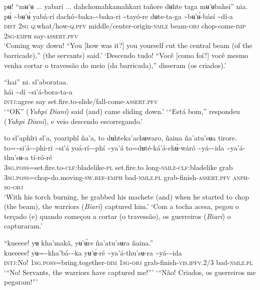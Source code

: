\documentclass[output=paper,
modfonts,nonflat
]{langsci/langscibook}
\begin{document}
\ea pʉ! “mʉ'ʉ ... yabari ... dahchomahkamahkari tañore dʉhte taga mʉ'ʉbahsi” nia. \\[.3em]
\gll pʉ́	{\textasciitilde}bʉ'ʉ́	yabá-rí	dachó{\textasciitilde}baka-{\textasciitilde}baka-ri	{\textasciitilde}tayó-re	dʉte-ta-ga {\textasciitilde}bʉ'ʉ́-básí	{\textasciitilde}dí-a\\
     \textsc{dist}	2\textsc{sg}	\textsc{q:}what/how-\textsc{q.pfv}	middle/center-origin\textsc{-nmlz}	beam\textsc{-obj}	chop-come-\textsc{imp} 2\textsc{sg-emph}	say-\textsc{assert.pfv}\\
\glt ‘Coming way down! “You [how was it?] you yourself cut the central beam (of the barricade),” (the servants) said.'
\glt ‘Descendo tudo! “Você [como foi?] você mesmo venha cortar o travessão do meio (da barricada),” disseram (os criados).’
\z 

\ea “hai” ni. sĩ'aborataa.  \\[.3em]
\gll hái	{\textasciitilde}dí	{\textasciitilde}si'á-bora-ta-a \\
     \textsc{intj:}agree	say	set.fire.to-slide/fall-come-\textsc{assert.pfv}\\
\glt ‘“OK” (\textit{Yuhpi Diani}) said (and) came sliding down.’
\glt ‘“Está bom,” respondeu (\textit{Yuhpi Diani}), e veio descendo escorregando.’
\z 

\ea to sĩ'aphĩri sĩ'a, yoariphĩ ña'a, to dʉhteka'achʉwaro, ñaina ña'atu'sʉa tirore. \\[.3em]
\gll to={\textasciitilde}si'á-{\textasciitilde}phi-ri	{\textasciitilde}si'á	yoá-rí-{\textasciitilde}phí	{\textasciitilde}ya'á to=dʉté-ká'á-chʉ́-wáró	{\textasciitilde}yá-{\textasciitilde}ida	{\textasciitilde}ya'á-thu'sʉ-a	tí-ró-ré\\
     3\textsc{sg.poss}=set.fire.to-\textsc{clf:}bladelike\textsc{-pl}	set.fire.to	long\textsc{-nmlz-clf:}bladelike	grab 3\textsc{sg.poss}=chop-do.moving-\textsc{sw.ref-emph}	bad\textsc{-nmlz.pl}	grab-finish-\textsc{assert.pfv}	\textsc{anph-sg-obj}\\
\glt ‘With his torch burning, he grabbed his machete (and) when he started to chop (the beam), the warriors (\textit{Biari}) captured him.’
\glt ‘Com a tocha acesa, pegou o terçado (e) quando começou a cortar (o travessão), os guerreiros (\textit{Biari}) o capturaram.’
\z 

 
\ea “kueeee! yʉ kha'makã, yʉ’ʉ́re ña'atu'sʉra ñaina.”  \\[.3em]
\gll kueeeee!	yʉ={\textasciitilde}kha'bá-{\textasciitilde}ka	yʉ’ʉ́-ré	{\textasciitilde}ya'á-thu'sʉ-ra	{\textasciitilde}yá-{\textasciitilde}ida \\
     \textsc{intj:}No!	1\textsc{sg.poss}=bring.together-\textsc{dim}	1\textsc{sg-obj}	grab-finish-\textsc{vis.ipfv.}2/3	bad\textsc{-nmlz.pl}\\
\glt ‘“No! Servants, the warriors have captured me!”’
\glt ‘“Não! Criados, os guerreiros me pegaram!”’
\z 
\end{document}
